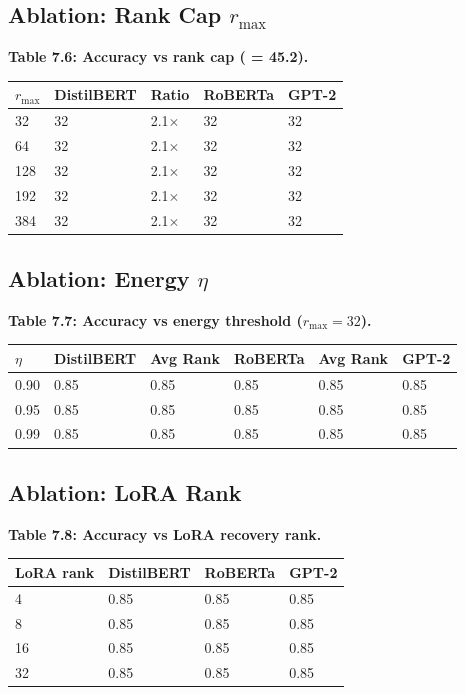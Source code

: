 \subsection{Ablation: Rank Cap $r_\text{max}$}

\textbf{Table 7.6: Accuracy vs rank cap (  = 45.2).}

\begin{table}[H]
\centering
\small
\begin{tabular}{lllll}
\toprule
\textbf{$r_\text{max}$} & \textbf{DistilBERT} & \textbf{Ratio} & \textbf{RoBERTa} & \textbf{GPT-2} \\
\midrule
32 & 32 & 2.1$\times$ & 32 & 32 \\
64 & 32 & 2.1$\times$ & 32 & 32 \\
128 & 32 & 2.1$\times$ & 32 & 32 \\
192 & 32 & 2.1$\times$ & 32 & 32 \\
384 & 32 & 2.1$\times$ & 32 & 32 \\
\bottomrule
\end{tabular}
\end{table}

\subsection{Ablation: Energy $\eta$}

\textbf{Table 7.7: Accuracy vs energy threshold ($r_\text{max} = 32$).}

\begin{table}[H]
\centering
\small
\begin{tabular}{llllll}
\toprule
\textbf{$\eta$} & \textbf{DistilBERT} & \textbf{Avg Rank} & \textbf{RoBERTa} & \textbf{Avg Rank} & \textbf{GPT-2} \\
\midrule
0.90 & 0.85 & 0.85 & 0.85 & 0.85 & 0.85 \\
0.95 & 0.85 & 0.85 & 0.85 & 0.85 & 0.85 \\
0.99 & 0.85 & 0.85 & 0.85 & 0.85 & 0.85 \\
\bottomrule
\end{tabular}
\end{table}

\subsection{Ablation: LoRA Rank}

\textbf{Table 7.8: Accuracy vs LoRA recovery rank.}

\begin{table}[H]
\centering
\small
\begin{tabular}{llll}
\toprule
\textbf{LoRA rank} & \textbf{DistilBERT} & \textbf{RoBERTa} & \textbf{GPT-2} \\
\midrule
4 & 0.85 & 0.85 & 0.85 \\
8 & 0.85 & 0.85 & 0.85 \\
16 & 0.85 & 0.85 & 0.85 \\
32 & 0.85 & 0.85 & 0.85 \\
\bottomrule
\end{tabular}
\end{table}

